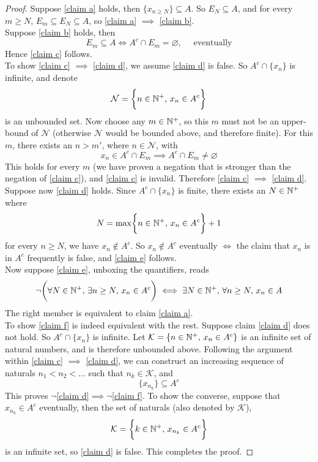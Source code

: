 \documentclass[../../main.tex]{subfiles}
\begin{document}
\begin{proof}
    Suppose \ref{claim a} holds, then $\{x_{n\geq N}\}\subseteq A$. So $E_N\subseteq A$, and for every $m\geq N$, $E_m\subseteq E_N\subseteq A$, so \ref{claim a} $\implies$ \ref{claim b}.\\
    
    Suppose \ref{claim b} holds, then 
    \[
    E_m\subseteq A\iff A^c\cap E_m=\varnothing,\quad\text{ eventually}
    \]
    Hence \ref{claim c} follows.\\
    
    To show \ref{claim c} $\implies$ \ref{claim d}, we assume \ref{claim d} is false. So $A^c\cap\{x_n\}$ is infinite, and denote
    \[
    \mathcal{N}=\biggl\{n\in\mathbb{N}^+,\, x_n\in A^c\biggr\}
    \]
    is an unbounded set. Now choose any $m\in\mathbb{N}^+$, so this $m$ must not be an upper-bound of $\mathcal{N}$ (otherwise $\mathcal{N}$ would be bounded above, and therefore finite). For this $m$, there exists an $n>m'$, where $n\in\mathcal{N}$, with
    \[
    x_n\in A^c\cap E_m\implies A^c\cap E_m\neq\varnothing
    \]
    This holds for every $m$ (we have proven a negation that is stronger than the negation of \ref{claim c}), and \ref{claim c} is invalid. Therefore \ref{claim c} $\implies$ \ref{claim d}.\\
    
    Suppose now \ref{claim d} holds. Since $A^c\cap\{x_n\}$ is finite, there exists an $N\in\mathbb{N}^+$ where 
    \[
    N=\max\biggl\{n\in\mathbb{N}^+,\,x_n\in A^c\biggr\}+1
    \]
    for every $n\geq N$, we have $x_n\notin A^c$. So $x_n\notin A^c$ eventually $\iff$ the claim that  $x_n$ is in $A^c$ frequently is false, and \ref{claim e} follows.\\
    
    Now suppose \ref{claim e}, unboxing the quantifiers, reads
    \[
    \neg\biggl(\forall N\in\mathbb{N}^+,\,\exists n\geq N,\,x_n\in A^c\biggr)\iff \exists N\in\mathbb{N}^+,\,\forall n\geq N,\, x_n\in A
    \]
    The right member is equivalent to claim \ref{claim a}.\\
    
    To show \ref{claim f} is indeed equivalent with the rest. Suppose claim \ref{claim d} does not hold. So $A^c\cap \{x_n\}$ is infinite. Let $\mathcal{K}=\{n\in\mathbb{N}^+,\,x_n\in A^c\}$ is an infinite set of natural numbers, and is therefore unbounded above. Following the argument within \ref{claim c} $\implies$ \ref{claim d}, we can construct an increasing sequence of naturals $n_1<n_2<\ldots$ such that $n_k\in \mathcal{K}$, and
    \[
    \{x_{n_k}\}\subseteq A^c
    \]
    This proves $\neg$\ref{claim d}$\implies\neg$\ref{claim f}. To show the converse, suppose that $x_{n_k}\in A^c$ eventually, then the set of naturals (also denoted by $\mathcal{K}$), 
    \[
    \mathcal{K}=\biggl\{k\in\mathbb{N}^+,\,x_{n_k}\in A^c\biggr\}
    \]
    is an infinite set, so \ref{claim d} is false. This completes the proof.
\end{proof}
\end{document}
